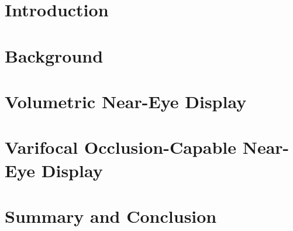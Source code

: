 





\chapter{Introduction}
\label{introduction}


\chapter{Background}
\label{background}


\chapter{Volumetric Near-Eye Display}
\label{volumetric_ned}


\chapter{Varifocal Occlusion-Capable Near-Eye Display}
\label{varifocal_occlusion_ned}


\chapter{Summary and Conclusion}
\label{conclusion}





